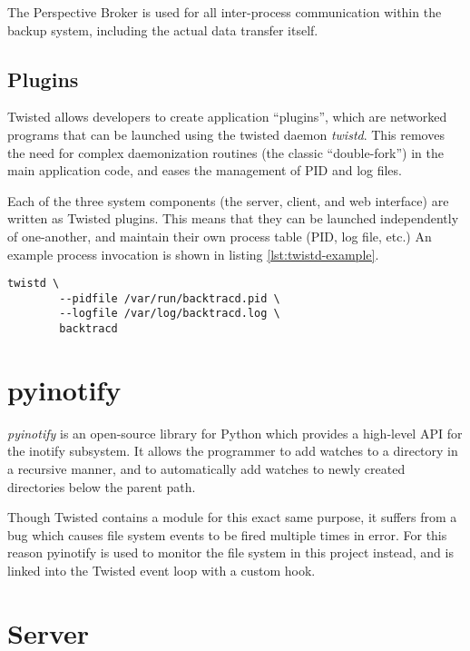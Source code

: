 The Perspective Broker is used for all inter-process communication within the
backup system, including the actual data transfer itself.

\subsection{Plugins}
\label{sec:implementation-twisted-plugins}

Twisted allows developers to create application ``plugins'', which are
networked programs that can be launched using the twisted daemon \emph{twistd}.
This removes the need for complex daemonization routines (the classic
``double-fork'') in the main application code, and eases the management of PID
and log files.

Each of the three system components (the server, client, and web interface) are
written as Twisted plugins. This means that they can be launched independently
of one-another, and maintain their own process table (PID, log file, etc.) An
example process invocation is shown in listing \ref{lst:twistd-example}.

\begin{singlespacing}
\begin{lstlisting}[caption=An example twistd invocation,
    label=lst:twistd-example]
    twistd \
        --pidfile /var/run/backtracd.pid \
        --logfile /var/log/backtracd.log \
        backtracd
\end{lstlisting}
\end{singlespacing}

\section{pyinotify}
\label{sec:implementation-pyinotify}

\emph{pyinotify} is an open-source library for Python which provides
a high-level API for the inotify subsystem. It allows the programmer to add
watches to a directory in a recursive manner, and to automatically add watches
to newly created directories below the parent path.

Though Twisted contains a module for this exact same purpose, it suffers from
a bug which causes file system events to be fired multiple times in error. For
this reason pyinotify is used to monitor the file system in this project
instead, and is linked into the Twisted event loop with a custom hook.

\section{Server}
\label{sec:implementation-server}

